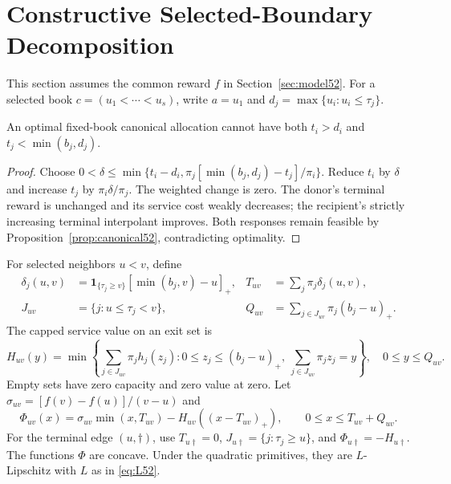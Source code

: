 \section{Constructive Selected-Boundary Decomposition}\label{sec:boundaries52}
This section assumes the common reward $f$ in Section~\ref{sec:model52}. For a selected book $c=(u_1<\cdots<u_s)$, write $a=u_1$ and $d_j=\max\{u_i:u_i\leq\tau_j\}$.
\begin{lemma}\label{lem:terminal52}
An optimal fixed-book canonical allocation cannot have both $t_i>d_i$ and $t_j<\min(b_j,d_j)$.
\end{lemma}
\begin{proof}
Choose $0<\delta\leq\min\{t_i-d_i,\pi_j[\min(b_j,d_j)-t_j]/\pi_i\}$. Reduce $t_i$ by $\delta$ and increase $t_j$ by $\pi_i\delta/\pi_j$. The weighted change is zero. The donor's terminal reward is unchanged and its service cost weakly decreases; the recipient's strictly increasing terminal interpolant improves. Both responses remain feasible by Proposition~\ref{prop:canonical52}, contradicting optimality.
\end{proof}
For selected neighbors $u<v$, define
\begin{align}
 \delta_j(u,v)&=\mathbf1_{\{\tau_j\geq v\}}[\min(b_j,v)-u]_+,
 &T_{uv}&=\sum_j\pi_j\delta_j(u,v),\label{eq:terminalarc52}\\
 J_{uv}&=\{j:u\leq\tau_j<v\},
 &Q_{uv}&=\sum_{j\in J_{uv}}\pi_j(b_j-u)_+.\label{eq:exit52}
\end{align}
The capped service value on an exit set is
\begin{equation}\label{eq:servicearc52}
 H_{uv}(y)=\min\left\{\sum_{j\in J_{uv}}\pi_jh_j(z_j):
 0\leq z_j\leq(b_j-u)_+,\ \sum_{j\in J_{uv}}\pi_jz_j=y\right\},\quad 0\leq y\leq Q_{uv}.
\end{equation}
Empty sets have zero capacity and zero value at zero. Let $\sigma_{uv}=[f(v)-f(u)]/(v-u)$ and
\begin{equation}\label{eq:arc52}
 \Phi_{uv}(x)=\sigma_{uv}\min(x,T_{uv})-H_{uv}((x-T_{uv})_+),
 \qquad 0\leq x\leq T_{uv}+Q_{uv}.
\end{equation}
For the terminal edge $(u,\dagger)$, use $T_{u\dagger}=0$, $J_{u\dagger}=\{j:\tau_j\geq u\}$, and $\Phi_{u\dagger}=-H_{u\dagger}$. The functions $\Phi$ are concave. Under the quadratic primitives, they are $L$-Lipschitz with $L$ as in \eqref{eq:L52}.


